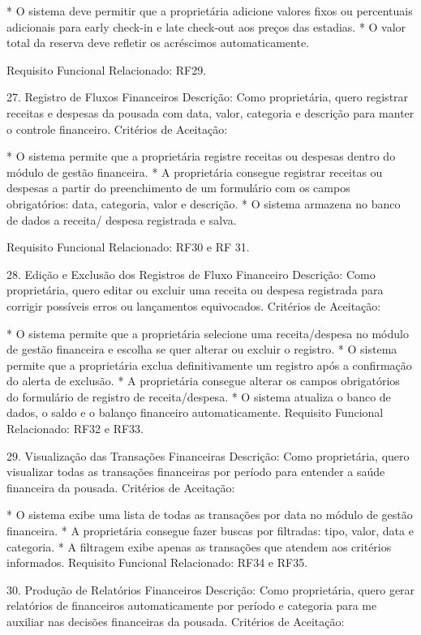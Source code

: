 * O sistema deve permitir que a proprietária adicione valores fixos ou percentuais adicionais para early check-in e late check-out aos preços das estadias.
* O valor total da reserva deve refletir os acréscimos automaticamente.


Requisito Funcional Relacionado: RF29.


27.  Registro de Fluxos Financeiros
Descrição: Como proprietária, quero registrar receitas e despesas da pousada com data, valor, categoria e descrição para manter o controle financeiro. 
Critérios de Aceitação:
 
* O sistema permite que a proprietária registre receitas ou despesas dentro do módulo de gestão financeira.
* A proprietária consegue registrar receitas ou despesas a partir do preenchimento de um formulário com os campos obrigatórios: data, categoria, valor e descrição.
* O sistema armazena no banco de dados a receita/ despesa registrada e salva.


Requisito Funcional Relacionado: RF30 e RF 31.


28. Edição e Exclusão dos Registros de Fluxo Financeiro
Descrição: Como proprietária, quero editar ou excluir uma receita ou despesa registrada para corrigir possíveis erros ou lançamentos equivocados.
Critérios de Aceitação:


* O sistema permite que a proprietária selecione uma receita/despesa no módulo de gestão financeira e escolha se quer alterar ou excluir o registro.
* O sistema permite que a proprietária exclua definitivamente um registro após a confirmação do alerta de exclusão.
* A proprietária consegue alterar os campos obrigatórios do formulário de registro de receita/despesa.
* O sistema atualiza o banco de dados, o saldo e o balanço financeiro automaticamente. 
Requisito Funcional Relacionado:  RF32 e RF33.




29.  Visualização das Transações Financeiras
Descrição: Como proprietária, quero visualizar todas as transações financeiras por período para entender a saúde financeira da pousada. 
Critérios de Aceitação:


* O sistema exibe uma lista de todas as transações por data no módulo de gestão financeira.
* A proprietária consegue fazer buscas por filtradas: tipo, valor, data e categoria.
* A filtragem exibe apenas as transações que atendem aos critérios informados.
Requisito Funcional Relacionado:  RF34 e RF35.


30. Produção de Relatórios Financeiros
Descrição: Como proprietária, quero gerar relatórios de financeiros automaticamente por período e categoria para me auxiliar nas decisões financeiras da pousada.
Critérios de Aceitação:


